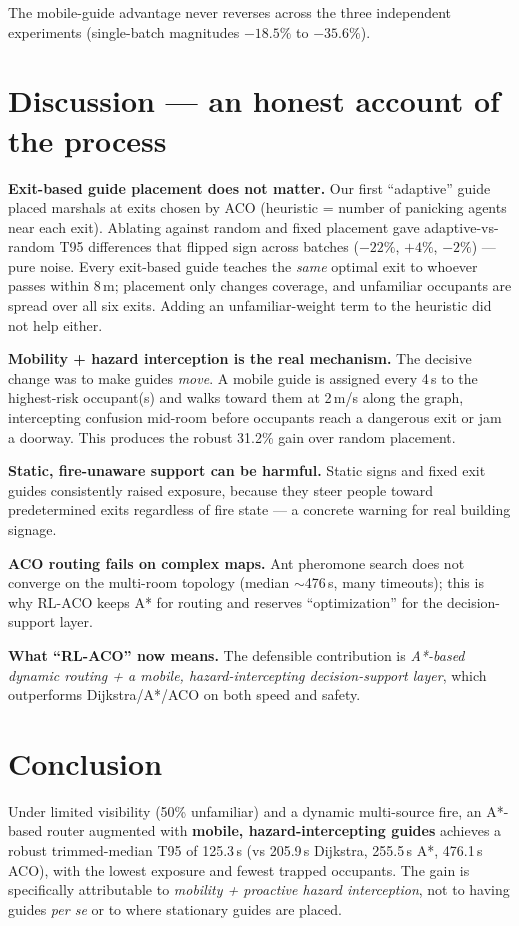 \documentclass[11pt,a4paper]{article}
\begin{document}
The mobile-guide advantage never reverses across the three independent experiments (single-batch
magnitudes $-18.5\%$ to $-35.6\%$).

\section{Discussion --- an honest account of the process}

\textbf{Exit-based guide placement does not matter.} Our first ``adaptive'' guide placed marshals
at exits chosen by ACO (heuristic = number of panicking agents near each exit). Ablating against
random and fixed placement gave adaptive-vs-random T95 differences that flipped sign across
batches ($-22\%$, $+4\%$, $-2\%$) --- pure noise. Every exit-based guide teaches the \emph{same}
optimal exit to whoever passes within 8\,m; placement only changes coverage, and unfamiliar
occupants are spread over all six exits. Adding an unfamiliar-weight term to the heuristic did not
help either.

\textbf{Mobility + hazard interception is the real mechanism.} The decisive change was to make
guides \emph{move}. A mobile guide is assigned every 4\,s to the highest-risk occupant(s) and walks
toward them at 2\,m/s along the graph, intercepting confusion mid-room before occupants reach a
dangerous exit or jam a doorway. This produces the robust 31.2\% gain over random placement.

\textbf{Static, fire-unaware support can be harmful.} Static signs and fixed exit guides
consistently raised exposure, because they steer people toward predetermined exits regardless of
fire state --- a concrete warning for real building signage.

\textbf{ACO routing fails on complex maps.} Ant pheromone search does not converge on the
multi-room topology (median $\sim$476\,s, many timeouts); this is why RL-ACO keeps A* for routing
and reserves ``optimization'' for the decision-support layer.

\textbf{What ``RL-ACO'' now means.} The defensible contribution is \emph{A*-based dynamic routing
+ a mobile, hazard-intercepting decision-support layer}, which outperforms Dijkstra/A*/ACO on both
speed and safety.

\section{Conclusion}

Under limited visibility (50\% unfamiliar) and a dynamic multi-source fire, an A*-based router
augmented with \textbf{mobile, hazard-intercepting guides} achieves a robust trimmed-median T95 of
125.3\,s (vs 205.9\,s Dijkstra, 255.5\,s A*, 476.1\,s ACO), with the lowest exposure and fewest
trapped occupants. The gain is specifically attributable to \emph{mobility + proactive hazard
interception}, not to having guides \emph{per se} or to where stationary guides are placed.
\end{document}
